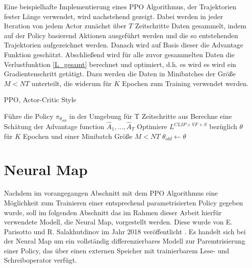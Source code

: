 Eine beispielhafte Implementierung eines \ac{PPO} Algorithmus, der Trajektorien fester Länge verwendet, wird nachstehend gezeigt. Dabei werden in jeder Iteration von jedem Actor zunächst über $T$ Zeitschritte Daten gesammelt, indem auf der Policy basierend Aktionen ausgeführt werden und die so entstehenden Trajektorien aufgezeichnet werden. Danach wird auf Basis dieser die Advantage Funktion geschätzt. Abschließend wird für alle zuvor gesammelten Daten die Verlustfunktion \eqref{L_gesamt} berechnet und optimiert, d.h. es wird es wird ein Gradientenschritt getätigt. Dazu werden die Daten in Minibatches der Größe $M<NT$ unterteilt, die widerum für $K$ Epochen zum Training verwendet werden.

\begin{algorithm}
	\caption{\ac{PPO}, Actor-Critic Style}
	\begin{algorithmic}
        \State Führe die Policy $\pi_{\theta_{old}}$ in der Umgebung für T Zeitschritte aus
				\State Berechne eine Schätung der Advantage function $\hat{A}_1,\dots,\hat{A}_T$
			\EndFor
			\State Optimiere $L^{CLIP+VF+S}$ bezüglich $\theta$ für $K$ Epochen und einer Minibatch Größe $M<NT$
			\State $\theta_{old} \gets \theta$
		\EndFor
	\end{algorithmic}
\end{algorithm}


\section{Neural Map}
\label{sec_neural_map}

Nachdem im vorangegangen Abschnitt mit dem \ac{PPO} Algorithmus eine Möglichkeit zum Trainieren einer entsprechend parametrisierten Policy gegeben wurde, soll im folgenden Abschnitt das im Rahmen dieser Arbeit hierfür verwendete Modell, die Neural Map, vorgestellt werden. Diese wurde von E. Parisotto und R. Salakhutdinov im Jahr 2018 veröffentlicht \cite{NeuralMap}. Es handelt sich bei der Neural Map um ein vollständig differenzierbares Modell zur Paremtrisierung einer Policy, das über einen externen Speicher mit trainierbarem Lese- und Schreiboperator verfügt. \\


